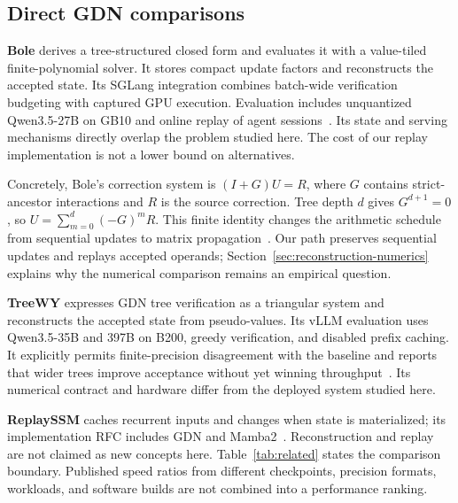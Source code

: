 \documentclass[conference]{IEEEtran}
\begin{document}
\subsection{Direct GDN comparisons}
\textbf{Bole} derives a tree-structured closed form and evaluates it with a value-tiled finite-polynomial solver. It stores compact update factors and reconstructs the accepted state. Its SGLang integration combines batch-wide verification budgeting with captured GPU execution. Evaluation includes unquantized Qwen3.5-27B on GB10 and online replay of agent sessions~\cite{wang2026bole}. Its state and serving mechanisms directly overlap the problem studied here. The cost of our replay implementation is not a lower bound on alternatives.

Concretely, Bole's correction system is $(I+G)U=R$, where $G$ contains strict-ancestor interactions and $R$ is the source correction. Tree depth $d$ gives $G^{d+1}=0$, so $U=\sum_{m=0}^{d}(-G)^mR$. This finite identity changes the arithmetic schedule from sequential updates to matrix propagation~\cite{wang2026bole}. Our path preserves sequential updates and replays accepted operands; Section~\ref{sec:reconstruction-numerics} explains why the numerical comparison remains an empirical question.

\textbf{TreeWY} expresses GDN tree verification as a triangular system and reconstructs the accepted state from pseudo-values. Its vLLM evaluation uses Qwen3.5-35B and 397B on B200, greedy verification, and disabled prefix caching. It explicitly permits finite-precision disagreement with the baseline and reports that wider trees improve acceptance without yet winning throughput~\cite{ghantasala2026treewy}. Its numerical contract and hardware differ from the deployed system studied here.

\textbf{ReplaySSM} caches recurrent inputs and changes when state is materialized; its implementation RFC includes GDN and Mamba2~\cite{replayssm2026}. Reconstruction and replay are not claimed as new concepts here. Table~\ref{tab:related} states the comparison boundary. Published speed ratios from different checkpoints, precision formats, workloads, and software builds are not combined into a performance ranking.
\end{document}
